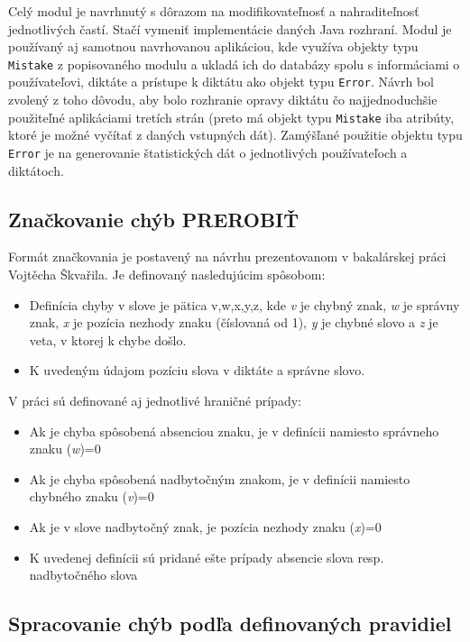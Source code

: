 \documentclass[12pt,oneside]{fithesis2}
\begin{document}
      \par Celý modul je navrhnutý s dôrazom na modifikovateľnosť a nahraditeľnosť jednotlivých častí. Stačí vymeniť implementácie daných Java rozhraní. Modul je používaný aj samotnou navrhovanou aplikáciou, kde využíva objekty typu \texttt{Mistake} z popisovaného modulu a ukladá ich do databázy spolu s informáciami o používateľovi, diktáte a prístupe k diktátu ako objekt typu \texttt{Error}. Návrh bol zvolený z toho dôvodu, aby bolo rozhranie opravy diktátu čo najjednoduchšie použiteľné aplikáciami tretích strán (preto má objekt typu \texttt{Mistake} iba atribúty, ktoré je možné vyčítať z daných vstupných dát). Zamýšľané použitie objektu typu \texttt{Error} je na generovanie štatistických dát o jednotlivých používateľoch a diktátoch.
      
      \subsection{Značkovanie chýb PREROBIŤ}
      \par Formát značkovania je postavený na návrhu prezentovanom v bakalárskej práci Vojtěcha Škvařila\cite{skvaril14}. Je definovaný nasledujúcim spôsobom:
      \begin{itemize}
	\item Definícia chyby v slove je pätica v,w,x,y,z, kde \textit{v} je chybný znak, \textit{w} je správny znak, \textit{x} je pozícia nezhody znaku (číslovaná od 1), \textit{y} je chybné slovo a \textit{z} je veta, v ktorej k chybe došlo.
	\item K uvedeným údajom pozíciu slova v diktáte a správne slovo.
	\end{itemize}

V práci sú definované aj jednotlivé hraničné prípady:	
	
	 \begin{itemize}
	\item Ak je chyba spôsobená absenciou znaku, je v definícii namiesto správneho znaku (\textit{w})=0
	\item Ak je chyba spôsobená nadbytočným znakom, je v definícii namiesto chybného znaku (\textit{v})=0
	\item Ak je v slove nadbytočný znak, je pozícia nezhody znaku (\textit{x})=0
	\item K uvedenej definícii sú pridané ešte prípady absencie slova resp. nadbytočného slova
\end{itemize}

      \subsection{Spracovanie chýb podľa definovaných pravidiel}	      
      
\end{document}
